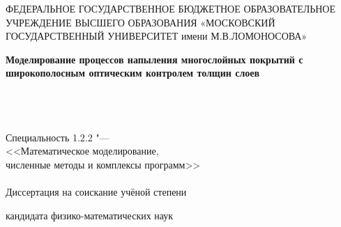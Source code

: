 \thispagestyle{empty}


\vspace{0pt plus2fill} %
\begin{center}
	ФЕДЕРАЛЬНОЕ ГОСУДАРСТВЕННОЕ БЮДЖЕТНОЕ ОБРАЗОВАТЕЛЬНОЕ УЧРЕЖДЕНИЕ ВЫСШЕГО ОБРАЗОВАНИЯ
	«МОСКОВСКИЙ ГОСУДАРСТВЕННЫЙ УНИВЕРСИТЕТ
	имени М.В.ЛОМОНОСОВА»
\end{center}

\vspace{0pt plus2fill} %

\vspace{0pt plus6fill}
\begin{center}
	\textbf {\large %
		Моделирование процессов напыления многослойных покрытий с широкополосным оптическим контролем толщин слоев
	} \\ \ \\ \
	{\large 
		}
	\\ \ 
	
	{
		Специальность 1.2.2 "---\\
		<<Математическое моделирование, \\
		численные методы и комплексы программ>> \\ \ \\
	}
	Диссертация на соискание учёной степени 
	
	кандидата физико-математических наук \\ \ \\ 
\end{center}

